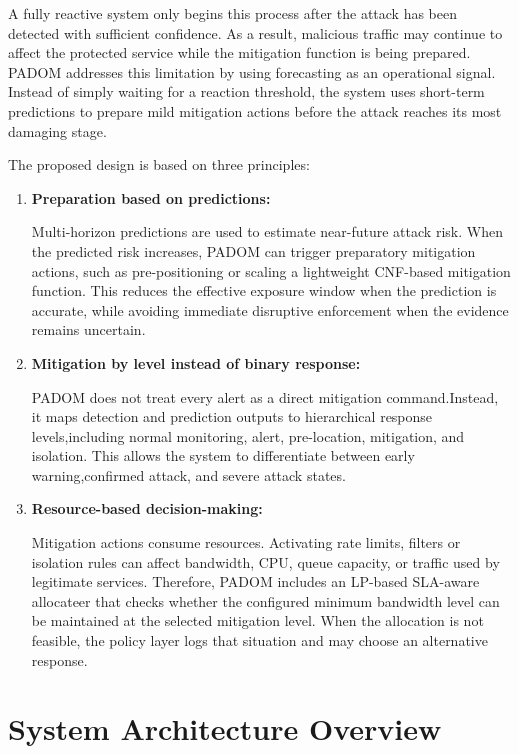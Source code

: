 \documentclass[12pt, a4paper, reqno, oneside]{book}
\newcommand{\padonap}{\textsc{PADOM}}
\begin{document}
A fully reactive system only begins this process after the attack has been detected with sufficient confidence. As a result, malicious traffic may continue to affect the protected service while the mitigation function is being prepared. \padonap{} addresses this limitation by using forecasting as an operational signal. Instead of simply waiting for a reaction threshold, the system uses short-term predictions to prepare mild mitigation actions before the attack reaches its most damaging stage.

The proposed design is based on three principles:

\begin{enumerate}

\item \textbf{Preparation based on predictions:}

Multi-horizon predictions are used to estimate near-future attack risk. When the predicted risk increases, \padonap{} can trigger preparatory mitigation actions, such as pre-positioning or scaling a lightweight CNF-based mitigation function. This reduces the effective exposure window when the prediction is accurate, while avoiding immediate disruptive enforcement when the evidence remains uncertain.

\item \textbf{Mitigation by level instead of binary response:}

\padonap{} does not treat every alert as a direct mitigation command.Instead, it maps detection and prediction outputs to hierarchical response levels,including normal monitoring, alert, pre-location, mitigation, and isolation. This allows the system to differentiate between early warning,confirmed attack, and severe attack states.

\item \textbf{Resource-based decision-making:}

Mitigation actions consume resources. Activating rate limits, filters or isolation rules can affect bandwidth, CPU, queue capacity, or traffic used by legitimate services. Therefore, \padonap{} includes an LP-based SLA-aware allocateer that checks whether the configured minimum bandwidth level can be maintained at the selected mitigation level. When the allocation is not feasible, the policy layer logs that situation and may choose an alternative response.
\end{enumerate}

\section{System Architecture Overview}
\label{sec:arch-overview}
\end{document}
